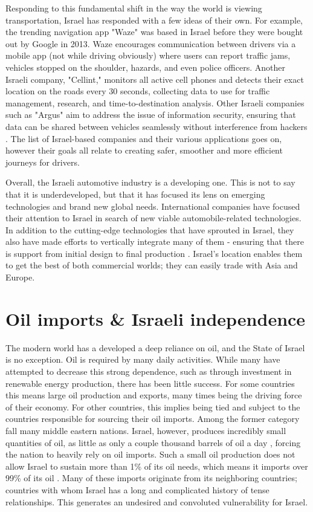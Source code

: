 \documentclass{report}                         %
\begin{document}
Responding to this fundamental shift in the way the world is viewing transportation, Israel has responded with a few ideas of their own. For example, the trending navigation app "Waze" was based in Israel before they were bought out by Google in 2013. Waze encourages communication between drivers via a mobile app (not while driving obviously) where users can report traffic jams, vehicles stopped on the shoulder, hazards, and even police officers. Another Israeli company, "Cellint," monitors all active cell phones and detects their exact location on the roads every 30 seconds, collecting data to use for traffic management, research, and time-to-destination analysis. Other Israeli companies such as "Argus" aim to address the issue of information security, ensuring that data can be shared between vehicles seamlessly without interference from hackers \cite{MinistryofEconomyandIndustryStateofIsraelTheIsrael}. The list of Israel-based companies and their various applications goes on, however their goals all relate to creating safer, smoother and more efficient journeys for drivers.

Overall, the Israeli automotive industry is a developing one. This is not to say that it is underdeveloped, but that it has focused its lens on emerging technologies and brand new global needs. International companies have focused their attention to Israel in search of new viable automobile-related technologies. In addition to the cutting-edge technologies that have sprouted in Israel, they also have made efforts to vertically integrate many of them - ensuring that there is support from initial design to final production \cite{MinistryofEconomyandIndustryStateofIsraelTheIsrael}. Israel's location enables them to get the best of both commercial worlds; they can easily trade with Asia and Europe.


\section{Oil imports \& Israeli independence}
The modern world has a developed a deep reliance on oil, and the State of Israel is no exception. Oil is required by many daily activities. While many have attempted to decrease this strong dependence, such as through investment in renewable energy production, there has been little success. For some countries this means large oil production and exports, many times being the driving force of their economy. For other countries, this implies being tied and subject to the countries responsible for sourcing their oil imports. Among the former category fall many middle eastern nations. Israel, however, produces incredibly small quantities of oil, as little as only a couple thousand barrels of oil a day \cite{Engber2006WhereOil}, forcing the nation to heavily rely on oil imports. Such a small oil production does not allow Israel to sustain more than 1\% of its oil needs, which means it imports over 99\% of its oil \cite{Engber2006WhereOil}. Many of these imports originate from its neighboring countries; countries with whom Israel has a long and complicated history of tense relationships. This generates an undesired and convoluted vulnerability for Israel.
    
\end{document}
